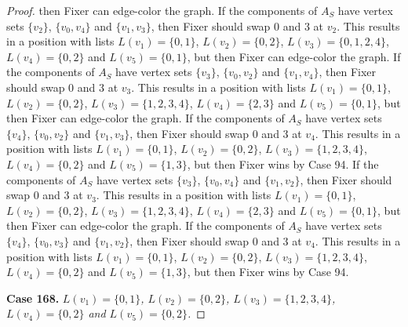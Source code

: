 \documentclass[12pt]{amsart}
\theoremstyle{plain}
\theoremstyle{definition}
\theoremstyle{remark}
\begin{document}
\begin{proof}
then Fixer can edge-color the graph. If the components of $A_S$ have vertex sets $\{v_2\}$, $\{v_0, v_4\}$ and $\{v_1, v_3\}$, then Fixer should swap 0 and 3 at $v_2$. This results in a position with lists $L(v_1) = \{0, 1\}$, $L(v_2) = \{0, 2\}$, $L(v_3) = \{0, 1, 2, 4\}$, $L(v_4) = \{0, 2\}$ and $L(v_5) = \{0, 1\}$, but then Fixer can edge-color the graph. If the components of $A_S$ have vertex sets $\{v_3\}$, $\{v_0, v_2\}$ and $\{v_1, v_4\}$, then Fixer should swap 0 and 3 at $v_3$. This results in a position with lists $L(v_1) = \{0, 1\}$, $L(v_2) = \{0, 2\}$, $L(v_3) = \{1, 2, 3, 4\}$, $L(v_4) = \{2, 3\}$ and $L(v_5) = \{0, 1\}$, but then Fixer can edge-color the graph. If the components of $A_S$ have vertex sets $\{v_4\}$, $\{v_0, v_2\}$ and $\{v_1, v_3\}$, then Fixer should swap 0 and 3 at $v_4$. This results in a position with lists $L(v_1) = \{0, 1\}$, $L(v_2) = \{0, 2\}$, $L(v_3) = \{1, 2, 3, 4\}$, $L(v_4) = \{0, 2\}$ and $L(v_5) = \{1, 3\}$, but then Fixer wins by Case 94. If the components of $A_S$ have vertex sets $\{v_3\}$, $\{v_0, v_4\}$ and $\{v_1, v_2\}$, then Fixer should swap 0 and 3 at $v_3$. This results in a position with lists $L(v_1) = \{0, 1\}$, $L(v_2) = \{0, 2\}$, $L(v_3) = \{1, 2, 3, 4\}$, $L(v_4) = \{2, 3\}$ and $L(v_5) = \{0, 1\}$, but then Fixer can edge-color the graph. If the components of $A_S$ have vertex sets $\{v_4\}$, $\{v_0, v_3\}$ and $\{v_1, v_2\}$, then Fixer should swap 0 and 3 at $v_4$. This results in a position with lists $L(v_1) = \{0, 1\}$, $L(v_2) = \{0, 2\}$, $L(v_3) = \{1, 2, 3, 4\}$, $L(v_4) = \{0, 2\}$ and $L(v_5) = \{1, 3\}$, but then Fixer wins by Case 94. 

\noindent\textbf{Case 168.  }\textit{$L(v_1) = \{0, 1\}$, $L(v_2) = \{0, 2\}$, $L(v_3) = \{1, 2, 3, 4\}$, $L(v_4) = \{0, 2\}$ and $L(v_5) = \{0, 2\}$.}


\end{proof}
\end{document}
